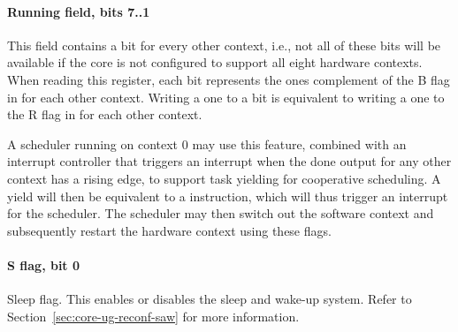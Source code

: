 \paragraph*{Running field, bits 7..1}
This field contains a bit for every other context, i.e., not all of these bits
will be available if the core is not configured to support all eight hardware
contexts. When reading this register, each bit represents the ones complement
of the B flag in  for each other context. Writing a one to a bit is
equivalent to writing a one to the R flag in  for each other context.

A scheduler running on context 0 may use this feature, combined with an
interrupt controller that triggers an interrupt when the done output for any
other context has a rising edge, to support task yielding for cooperative
scheduling. A yield will then be equivalent to a  instruction, which
will thus trigger an interrupt for the scheduler. The scheduler may then
switch out the software context and subsequently restart the hardware context
using these flags.
\paragraph*{S flag, bit 0}
Sleep flag. This enables or disables the sleep and wake-up system. Refer to
Section~\ref{sec:core-ug-reconf-saw} for more information.

